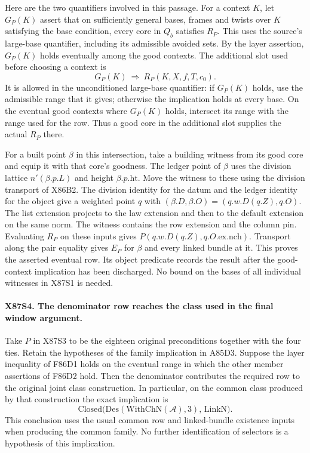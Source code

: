 Here are the two quantifiers involved in this passage. For a context
$K$, let $G_P(K)$ assert that on sufficiently general bases, frames
and twists over $K$ satisfying the base condition, every core in
$Q_b$ satisfies $R_P$. This uses the source's large-base quantifier,
including its admissible avoided sets. By the layer assertion,
$G_P(K)$ holds eventually among the good contexts. The additional
slot used before choosing a context is
\[
       G_P(K)\ \Longrightarrow\ R_P(K,X,f,T,c_0).
\]
It is allowed in the unconditioned large-base quantifier: if $G_P(K)$
holds, use the admissible range that it gives; otherwise the
implication holds at every base. On the eventual good contexts
where $G_P(K)$ holds, intersect its range with the range used
for the row. Thus a good core in the additional slot supplies the
actual $R_P$ there.

For a built point $\beta$ in this intersection, take a building
witness from its good core and equip it with that core's goodness.
The ledger point of $\beta$ uses the division lattice
$n'(\beta.p.L)$ and height $\beta.p.\mathrm{ht}$. Move the witness
to these using the division transport of X86B2. The division
identity for the datum and the ledger identity for the object
give a weighted point $q$ with
$(\beta.D,\beta.O)=(q.w.D(q.Z),q.O)$. The list extension projects to
the law extension and then to the default extension on the same norm.
The witness contains the row extension and the column pin.
Evaluating $R_P$ on these inputs gives $P(q.w.D(q.Z),q.O.\mathrm{ex}.\mathrm{nch})$.
Transport along the pair equality gives $E_P$ for $\beta$ and every
linked bundle at it. This proves the asserted eventual row. Its
object predicate records the result after the good-context
implication has been discharged. No bound on the bases of all
individual witnesses in X87S1 is needed.

\paragraph{X87S4. The denominator row reaches the class used in the final window argument.}
Take $P$ in X87S3 to be the eighteen original preconditions together
with the four ties. Retain the hypotheses of the family implication
in A85D3. Suppose the layer inequality of F86D1 holds on the
eventual range in which the other member assertions of F86D2 hold.
Then the denominator contributes the required row to the original
joint class construction. In particular, on the common class
produced by that construction the exact implication is
\[
    \mathrm{Closed}\bigl(\mathrm{Des}(\mathrm{WithChN}(\mathcal A),3),
                         \,\mathrm{LinkN}\bigr).
\]
This conclusion uses the usual common row and linked-bundle
existence inputs when producing the common family. No further
identification of selectors is a hypothesis of this implication.

